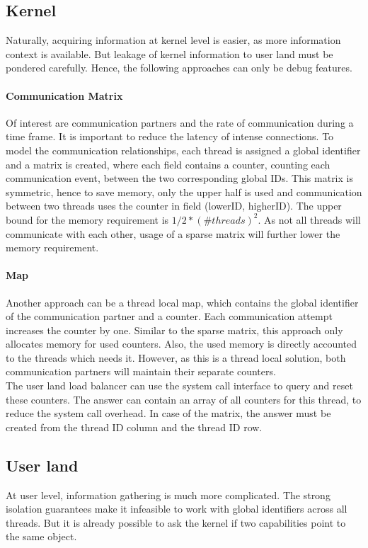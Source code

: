 \subsection{Kernel}
Naturally, acquiring information at kernel level is easier, as more information
context is available.
But leakage of kernel information to user land must be pondered carefully.
Hence, the following approaches can only be debug features.


\paragraph{Communication Matrix}
Of interest are communication partners and the rate of communication during a
time frame.
It is important to reduce the latency of intense connections.
To model the communication relationships, each thread is assigned a global
identifier and a matrix is created, where each field contains a counter,
counting each communication event, between the two corresponding global IDs.
This matrix is symmetric, hence to save memory, only the upper half is used
and communication between two threads uses the counter in field
(lowerID, higherID).
The upper bound for the memory requirement is $1/2 * (\#threads)^2$.
As not all threads will communicate with each other, usage of a sparse matrix
will further lower the memory requirement.

\paragraph{Map}
Another approach can be a thread local map, which contains the global
identifier of the communication partner and a counter.
Each communication attempt increases the counter by one.
Similar to the sparse matrix, this approach only allocates memory for used
counters.
Also, the used memory is directly accounted to the threads which needs it.
However, as this is a thread local solution, both communication partners will
maintain their separate counters.
\\

The user land load balancer can use the system call interface to query
and reset these counters.
The answer can contain an array of all counters for this thread, to reduce the
system call overhead.
In case of the matrix, the answer must be created from the thread ID column and
the thread ID row.


\subsection{User land}
At user level, information gathering is much more complicated.
The strong isolation guarantees make it infeasible to work with global
identifiers across all threads.
But it is already possible to ask the kernel if two capabilities point to the
same object.

